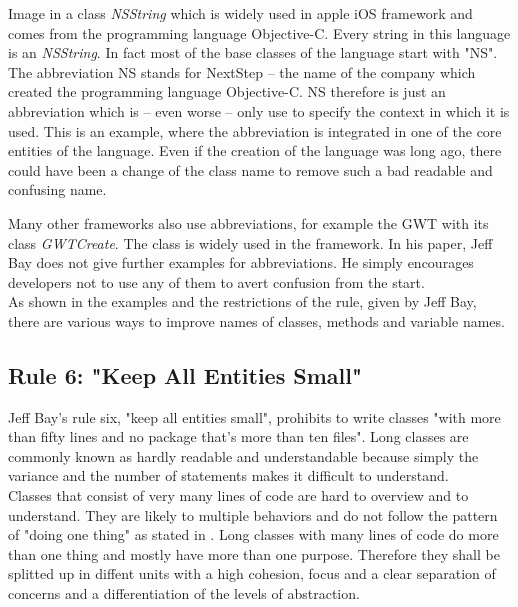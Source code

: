 Image in a class \textit{NSString} which is widely used in apple iOS framework and comes from the programming language Objective-C. Every string in this language is an \textit{NSString}. In fact most of the base classes of the language start with "NS". The abbreviation NS stands for NextStep -- the name of the company which created the programming language Objective-C. NS therefore is just an abbreviation which is -- even worse -- only use to specify the context in which it is used. This is an example, where the abbreviation is integrated in one of the core entities of the language. Even if the creation of the language was long ago, there could have been a change of the class name to remove such a bad readable and confusing name.

Many other frameworks also use abbreviations, for example the \ac{GWT} with its class \textit{GWTCreate}. The class is widely used in the framework. In his paper, Jeff Bay does not give further examples for abbreviations. He simply encourages developers not to use any of them to avert confusion from the start.
\\

As shown in the examples and the restrictions of the rule, given by Jeff Bay, there are various ways to improve names of classes, methods and variable names. 

\subsection*{Rule 6: "Keep All Entities Small"}
Jeff Bay's rule six, "keep all entities small", prohibits to write classes "with more than fifty lines and no package that's more than ten files". Long classes are commonly known as hardly readable and understandable because simply the variance and the number of statements makes it difficult to understand. 
\\

Classes that consist of very many lines of code are hard to overview and to understand. They are likely to multiple behaviors and do not follow the pattern of "doing one thing" as stated in \cite{cc}. Long classes with many lines of code do more than one thing and mostly have more than one purpose. Therefore they shall be splitted up in diffent units with a high cohesion, focus and a clear separation of concerns and a differentiation of the levels of abstraction. 
\\

